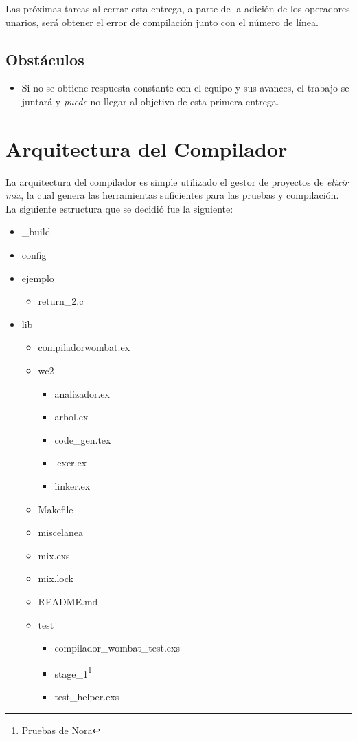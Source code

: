 \documentclass{article}
\begin{document}
Las próximas tareas al cerrar esta entrega, a parte de la adición de los
operadores unarios, será obtener el error de compilación junto con el número
de línea.

\subsection{Obstáculos}

\begin{itemize}
\item Si no se obtiene respuesta constante con el equipo y sus avances, el trabajo
  se juntará y \textit{puede} no llegar al objetivo de esta primera entrega.
\end{itemize}

\section{Arquitectura del Compilador}

La arquitectura del compilador es simple utilizado el gestor de proyectos de \textit{elixir}
\textit{mix}, la cual genera las herramientas suficientes para las pruebas y compilación. La
siguiente estructura que se decidió fue la siguiente:

\begin{itemize}
\item \_build
\item config
\item ejemplo
  \begin{itemize}
  \item return\_2.c
  \end{itemize}
\item lib
  \begin{itemize}
  \item compiladorwombat.ex
  \item wc2
    \begin{itemize}
    \item analizador.ex
    \item arbol.ex
    \item code\_gen.tex
    \item lexer.ex
    \item linker.ex
    \end{itemize}
  \item Makefile
  \item miscelanea
  \item mix.exs
  \item mix.lock
  \item README.md
  \item test
    \begin{itemize}
    \item compilador\_wombat\_test.exs
    \item stage\_1\footnote{Pruebas de Nora}
    \item test\_helper.exs
    \end{itemize}

  \end{itemize}

\end{itemize}
\end{document}
